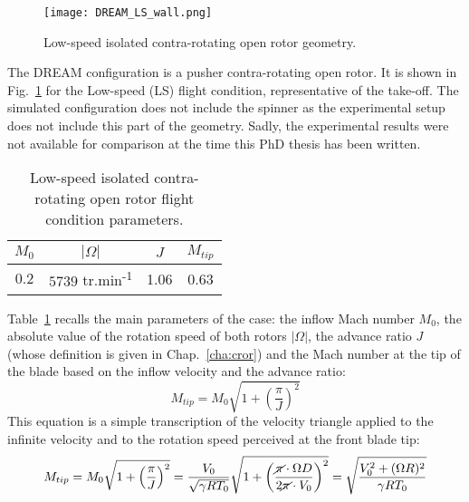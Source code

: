 

\begin{figure}[htb]
  \centering
  \texttt{[image: DREAM\_LS\_wall.png]}
  \caption{Low-speed isolated contra-rotating open rotor geometry.}
  \label{fig:dream_ls_wall}
\end{figure}

The DREAM configuration is a pusher contra-rotating open rotor.
It is shown in Fig.~\ref{fig:dream_ls_wall} for the
Low-speed (LS) flight condition, representative of the take-off. 
The simulated configuration does not include the spinner as the
experimental setup does not include this part of the geometry.
Sadly, the experimental results were not available for comparison
at the time this PhD thesis has been written.

\begin{table}[htb]
   \centering
  \begin{tabular}{cccc}
    \toprule
    $M_0$ & $|\Omega|$ & $J$ & $M_{tip}$ \\
    \midrule
    $0.2$ & $5739$ tr.min\textsuperscript{-1} & 1.06 & 0.63 \\
    \bottomrule
  \end{tabular}
  \caption{Low-speed isolated contra-rotating open rotor flight condition parameters.}
  \label{tab:dream_ls_flight_condition}
\end{table} 
Table~\ref{tab:dream_ls_flight_condition} recalls the main
parameters of the case: the inflow Mach number $M_0$,
the absolute value of the rotation speed of both rotors $|\Omega|$,
the advance ratio $J$ (whose definition is given in Chap.~\ref{cha:cror})
and the Mach number at the tip of
the blade based on the inflow velocity and the advance ratio:
\begin{equation}
	M_{tip} = M_0 \sqrt{1 + \left(\frac{\pi}{J} \right)^2}
\end{equation}
This equation is a simple transcription of the velocity triangle
applied to the infinite velocity and to the rotation speed perceived
at the front blade tip:
\begin{equation}
    M_{tip} = M_0 \sqrt{1 + \left(\frac{\pi}{J}\right)^2} = 
    \frac{V_0}{\sqrt{\gamma R T_0}} \sqrt{1 + \left(\frac{
    	\cancel{\pi} \cdot \Omega D}{
    	2 \cancel{\pi} \cdot V_0}\right)^2} =
    \sqrt{\frac{V_0^2 + (\Omega R)^2}{\gamma R T_0}}
    \label{eq:m_tip_explained}
\end{equation}

